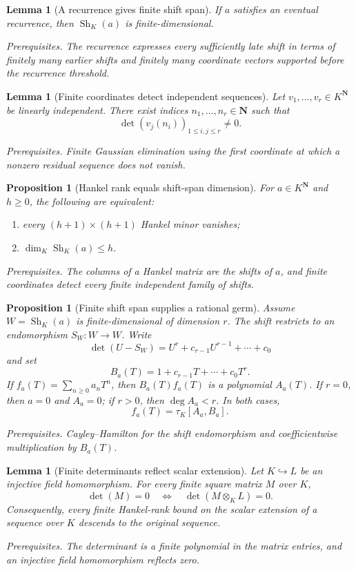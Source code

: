 \documentclass[10pt]{article}
\newtheorem{proposition}[theorem]{Proposition}
\newtheorem{lemma}[theorem]{Lemma}
\theoremstyle{definition}
\newcommand{\deps}[1]{\par\smallskip\noindent\textit{Prerequisites.} #1}
\begin{document}
\begin{lemma}[A recurrence gives finite shift span]
If \(a\) satisfies an eventual recurrence, then
\(\operatorname{Sh}_K(a)\) is finite-dimensional.
\deps{The recurrence expresses every sufficiently late shift in terms of
finitely many earlier shifts and finitely many coordinate vectors supported
before the recurrence threshold.}
\end{lemma}

\begin{lemma}[Finite coordinates detect independent sequences]
Let \(v_1,\ldots,v_r\in K^{\mathbf N}\) be linearly independent.  There
exist indices \(n_1,\ldots,n_r\in\mathbf N\) such that
\[
 \det(v_j(n_i))_{1\leq i,j\leq r}\neq0.
\]
\deps{Finite Gaussian elimination using the first coordinate at which a
nonzero residual sequence does not vanish.}
\end{lemma}

\begin{proposition}[Hankel rank equals shift-span dimension]
For \(a\in K^{\mathbf N}\) and \(h\geq0\), the following are equivalent:
\begin{enumerate}[label=\textup{(\roman*)}]
\item every \((h+1)\times(h+1)\) Hankel minor vanishes;
\item \(\dim_K\operatorname{Sh}_K(a)\leq h\).
\end{enumerate}
\deps{The columns of a Hankel matrix are the shifts of \(a\), and finite
coordinates detect every finite independent family of shifts.}
\end{proposition}

\begin{proposition}[Finite shift span supplies a rational germ]
Assume \(W=\operatorname{Sh}_K(a)\) is finite-dimensional of dimension
\(r\).  The shift restricts to an endomorphism \(S_W:W\to W\).  Write
\[
 \det(U-S_W)=U^r+c_{r-1}U^{r-1}+\cdots+c_0
\]
and set
\[
 B_a(T)=1+c_{r-1}T+\cdots+c_0T^r.
\]
If \(f_a(T)=\sum_{n\geq0}a_nT^n\), then
\(B_a(T)f_a(T)\) is a polynomial \(A_a(T)\).  If \(r=0\), then
\(a=0\) and \(A_a=0\); if \(r>0\), then \(\deg A_a<r\).  In both cases,
\[
 f_a(T)=\tau_K[A_a,B_a].
\]
\deps{Cayley--Hamilton for the shift endomorphism and coefficientwise
multiplication by \(B_a(T)\).}
\end{proposition}

\begin{lemma}[Finite determinants reflect scalar extension]
Let \(K\hookrightarrow L\) be an injective field homomorphism.  For every
finite square matrix \(M\) over \(K\),
\[
 \det(M)=0
 \quad\Longleftrightarrow\quad
 \det(M\otimes_KL)=0.
\]
Consequently, every finite Hankel-rank bound on the scalar extension of a
sequence over \(K\) descends to the original sequence.
\deps{The determinant is a finite polynomial in the matrix entries, and an
injective field homomorphism reflects zero.}
\end{lemma}
\end{document}
